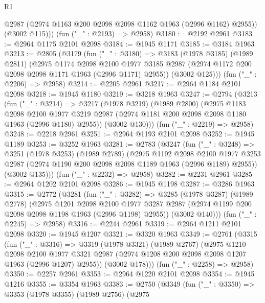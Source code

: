 \begin{lexlean}{R1}
\begin{coremodule}
          @2987
          (@2974 @1163 @200 @2098 @2098 @1162 @1963 (@2996 @1162) @2955))
        (@3002 @115)))
    (fun ("_" : @2193) => @2958)
@3180 := @2192 @2961
@3183 := @2964 @1175 @2101 @2098
@3184 := @1945 @1171
@3185 := @3184 @1963
@3213 := @2805
    (@3179
      (fun ("_" : @3180) =>
      @3183
        (@1978 @3185)
        (@1989 @2811)
        (@2975
          @1174
          @2098
          @2100
          @1977
          @3185
          @2987
          (@2974 @1172 @200 @2098 @2098 @1171 @1963 (@2996 @1171) @2955))
        (@3002 @125)))
    (fun ("_" : @2206) => @2958)
@3214 := @2205 @2961
@3217 := @2964 @1184 @2101 @2098
@3218 := @1945 @1180
@3219 := @3218 @1963
@3247 := @2794
    (@3213
      (fun ("_" : @3214) =>
      @3217
        (@1978 @3219)
        (@1989 @2800)
        (@2975
          @1183
          @2098
          @2100
          @1977
          @3219
          @2987
          (@2974 @1181 @200 @2098 @2098 @1180 @1963 (@2996 @1180) @2955))
        (@3002 @130)))
    (fun ("_" : @2219) => @2958)
@3248 := @2218 @2961
@3251 := @2964 @1193 @2101 @2098
@3252 := @1945 @1189
@3253 := @3252 @1963
@3281 := @2783
    (@3247
      (fun ("_" : @3248) =>
      @3251
        (@1978 @3253)
        (@1989 @2789)
        (@2975
          @1192
          @2098
          @2100
          @1977
          @3253
          @2987
          (@2974 @1190 @200 @2098 @2098 @1189 @1963 (@2996 @1189) @2955))
        (@3002 @135)))
    (fun ("_" : @2232) => @2958)
@3282 := @2231 @2961
@3285 := @2964 @1202 @2101 @2098
@3286 := @1945 @1198
@3287 := @3286 @1963
@3315 := @2772
    (@3281
      (fun ("_" : @3282) =>
      @3285
        (@1978 @3287)
        (@1989 @2778)
        (@2975
          @1201
          @2098
          @2100
          @1977
          @3287
          @2987
          (@2974 @1199 @200 @2098 @2098 @1198 @1963 (@2996 @1198) @2955))
        (@3002 @140)))
    (fun ("_" : @2245) => @2958)
@3316 := @2244 @2961
@3319 := @2964 @1211 @2101 @2098
@3320 := @1945 @1207
@3321 := @3320 @1963
@3349 := @2761
    (@3315
      (fun ("_" : @3316) =>
      @3319
        (@1978 @3321)
        (@1989 @2767)
        (@2975
          @1210
          @2098
          @2100
          @1977
          @3321
          @2987
          (@2974 @1208 @200 @2098 @2098 @1207 @1963 (@2996 @1207) @2955))
        (@3002 @178)))
    (fun ("_" : @2258) => @2958)
@3350 := @2257 @2961
@3353 := @2964 @1220 @2101 @2098
@3354 := @1945 @1216
@3355 := @3354 @1963
@3383 := @2750
    (@3349
      (fun ("_" : @3350) =>
      @3353
        (@1978 @3355)
        (@1989 @2756)
        (@2975

\end{coremodule}
\end{lexlean}
